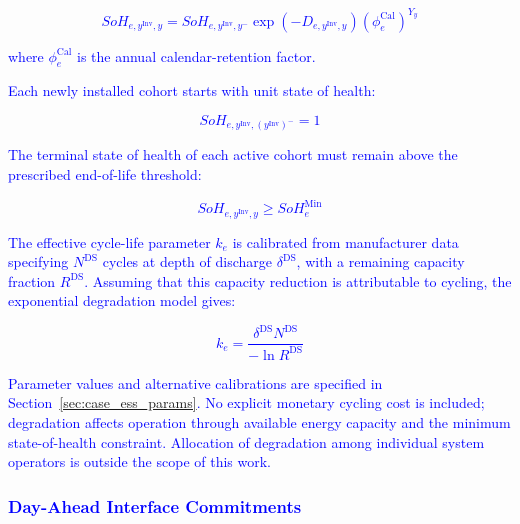 \documentclass[preprint,12pt]{elsarticle}
\begin{document}
\textcolor{blue}{
    \begin{equation}
        SoH_{e,y^{\text{Inv}},y}
        =
        SoH_{e,y^{\text{Inv}},y^{-}}
        \exp\!\left(-D_{e,y^{\text{Inv}},y}\right)
        \left(\phi^{\text{Cal}}_e\right)^{Y_y}
        \label{eq:soh_chain}
    \end{equation}
}

\noindent
\textcolor{blue}{
    where $\phi^{\text{Cal}}_e$ is the annual calendar-retention factor.
}

\textcolor{blue}{
    Each newly installed cohort starts with unit state of health:
}

\textcolor{blue}{
    \begin{equation}
        SoH_{e,y^{\text{Inv}},(y^{\text{Inv}})^{-}} = 1
        \label{eq:soh_initial}
    \end{equation}
}

\textcolor{blue}{
    The terminal state of health of each active cohort must remain above the prescribed end-of-life threshold:
}

\textcolor{blue}{
    \begin{equation}
        SoH_{e,y^\text{Inv},y} \ge SoH^{\text{Min}}_e
        \label{eq:soh_floor}
    \end{equation}
}

\textcolor{blue}{
    The effective cycle-life parameter $k_e$ is calibrated from manufacturer data specifying $N^{\text{DS}}$ cycles at depth of discharge $\delta^{\text{DS}}$, with a remaining capacity fraction $R^{\text{DS}}$. Assuming that this capacity reduction is attributable to cycling, the exponential degradation model gives:
}

\textcolor{blue}{
    \begin{equation}
        k_e = \frac{\delta^{\text{DS}} N^{\text{DS}}}{-\ln R^{\text{DS}}}
        \label{eq:cycle_life_calibration}
    \end{equation}
}

\textcolor{blue}{
    Parameter values and alternative calibrations are specified in Section~\ref{sec:case_ess_params}.
    No explicit monetary cycling cost is included; degradation affects operation through available energy capacity and the minimum state-of-health constraint. Allocation of degradation among individual system operators is outside the scope of this work.
}

\subsubsection{\textcolor{blue}{Day-Ahead Interface Commitments}}
\label{subsubsec:commitment}
\end{document}
